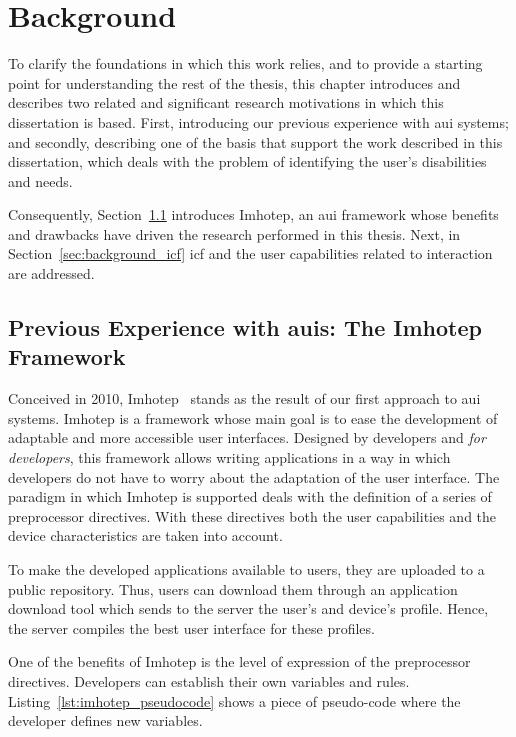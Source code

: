 \section{Background}
\label{sec:background}

To clarify the foundations in which this work relies, and to provide a starting 
point for understanding the rest of the thesis, this chapter introduces and 
describes two related and significant research motivations in which this dissertation is based. 
First, introducing our previous experience with \ac{aui} systems; and secondly, 
describing one of the basis that support the work described in this dissertation, 
which deals with the problem of identifying the user's disabilities and needs.

Consequently, Section~\ref{sec:background_imhotep} introduces Imhotep, an \ac{aui}
framework whose benefits and drawbacks have driven the research performed in this 
thesis. Next, in Section~\ref{sec:background_icf} \ac{icf} and the user capabilities 
related to interaction are addressed.

\subsection{Previous Experience with \acp{aui}: The Imhotep Framework}
\label{sec:background_imhotep}

Conceived in 2010, Imhotep~\citep{almeida_imhotep_2011} stands as the result of 
our first approach to \ac{aui} systems. Imhotep is a framework whose main goal
is to ease the development of adaptable and more accessible user interfaces. 
Designed by developers and \textit{for developers}, this framework allows
writing applications in a way in which developers do not have to worry about the 
adaptation of the user interface. The paradigm in which Imhotep is supported 
deals with the definition of a series of preprocessor directives. With these 
directives both the user capabilities and the device characteristics are taken
into account. 

To make the developed applications available to users, they are uploaded to 
a public repository. Thus, users can download them through an application 
download tool which sends to the server the user's and device's profile. Hence, 
the server compiles the best user interface for these profiles.

One of the benefits of Imhotep is the level of expression of the preprocessor
directives. Developers can establish their own variables and rules.
Listing~\ref{lst:imhotep_pseudocode} shows a piece of pseudo-code where the
developer defines new variables.

